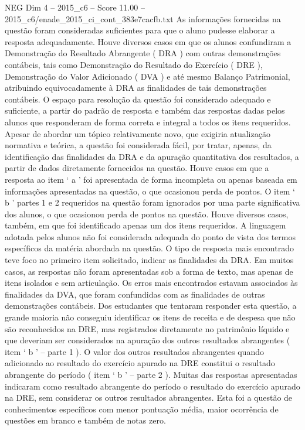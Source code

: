 \begin{textsample}{NEG Dim 4 – 2015\_c6 – Score 11.00 – 2015\_c6/enade\_2015\_ci\_cont\_383e7cacfb.txt}
As informações fornecidas na questão foram consideradas suficientes para que o aluno pudesse elaborar a resposta adequadamente.
Houve diversos casos em que os alunos confundiram a Demonstração do Resultado Abrangente ( DRA ) com outras demonstrações contábeis, tais como Demonstração do Resultado do Exercício ( DRE ), Demonstração do Valor Adicionado ( DVA ) e até mesmo Balanço Patrimonial, atribuindo equivocadamente à DRA as finalidades de tais demonstrações contábeis.
O espaço para resolução da questão foi considerado adequado e suficiente, a partir do padrão de resposta e também das respostas dadas pelos alunos que responderam de forma correta e integral a todos os itens requeridos.
Apesar de abordar um tópico relativamente novo, que exigiria atualização normativa e teórica, a questão foi considerada fácil, por tratar, apenas, da identificação das finalidades da DRA e da apuração quantitativa dos resultados, a partir de dados diretamente fornecidos na questão.
Houve casos em que a resposta ao item ‘ a ’ foi apresentada de forma incompleta ou apenas baseada em informações apresentadas na questão, o que ocasionou perda de pontos.
O item ‘ b ’ partes 1 e 2 requeridos na questão foram ignorados por uma parte significativa dos alunos, o que ocasionou perda de pontos na questão.
Houve diversos casos, também, em que foi identificado apenas um dos itens requeridos.
A linguagem adotada pelos alunos não foi considerada adequada do ponto de vista dos termos específicos da matéria abordada na questão.
O tipo de resposta mais encontrado teve foco no primeiro item solicitado, indicar as finalidades da DRA.
Em muitos casos, as respostas não foram apresentadas sob a forma de texto, mas apenas de itens isolados e sem articulação.
Os erros mais encontrados estavam associados às finalidades da DVA, que foram confundidas com as finalidades de outras demonstrações contábeis.
Dos estudantes que tentaram responder esta questão, a grande maioria não conseguiu identificar os itens de receita e de despesa que não são reconhecidos na DRE, mas registrados diretamente no patrimônio líquido e que deveriam ser considerados na apuração dos outros resultados abrangentes ( item ‘ b ’ – parte 1 ).
O valor dos outros resultados abrangentes quando adicionado ao resultado do exercício apurado na DRE constitui o resultado abrangente do período ( item ‘ b ’ – parte 2 ).
Muitas das respostas apresentadas indicaram como resultado abrangente do período o resultado do exercício apurado na DRE, sem considerar os outros resultados abrangentes.
Esta foi a questão de conhecimentos específicos com menor pontuação média, maior ocorrência de questões em branco e também de notas zero.

\end{textsample}
